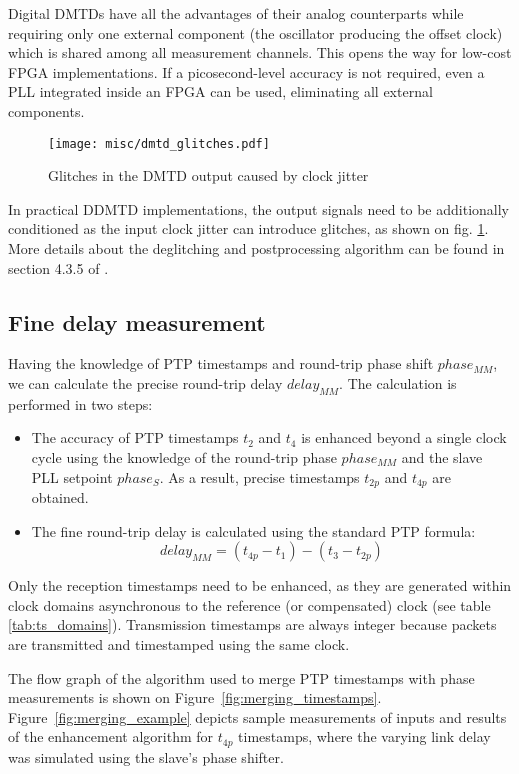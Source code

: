 Digital DMTDs have all the advantages of their analog counterparts while
requiring only one external component (the oscillator producing the offset
clock) which is shared among all measurement channels.	This opens the way
for low-cost FPGA implementations. If a picosecond-level accuracy is not
required, even a PLL integrated inside an FPGA can be used, eliminating all
external components.
\begin{figure}[ht!]
  \centering
  \texttt{[image: misc/dmtd\_glitches.pdf]}
  \caption{Glitches in the DMTD output caused by clock jitter}
  \label{fig:dmtd_glitches}
\end{figure}
In practical DDMTD implementations, the output signals need to be additionally
conditioned as the input clock jitter can introduce glitches, as shown
on fig. \ref{fig:dmtd_glitches}. More details about the deglitching and
postprocessing algorithm can be found in section 4.3.5 of \cite{tomekMSC}.

\subsection{Fine delay measurement}
\label{s:fine_delay}
Having the knowledge of PTP timestamps and round-trip phase shift $phase_{MM}$,
we can calculate the precise round-trip delay $delay_{MM}$. The calculation
is performed in two steps:
\begin{itemize}
\item The accuracy of PTP timestamps $t_{2}$ and $t_{4}$ is enhanced beyond a
single clock cycle using the knowledge of the round-trip phase $phase_{MM}$
and the slave PLL setpoint $phase_{S}$. As a result, precise timestamps
$t_{2p}$ and $t_{4p}$ are obtained.
\item The fine round-trip delay is calculated using the standard PTP formula:
\begin{equation}
\label{eq:ptp_precise}
delay_{MM} = (t_{4p} - t_{1}) - (t_{3} - t_{2p})
\end{equation}
\end{itemize}

Only the reception timestamps need to be enhanced, as they are generated
within clock domains asynchronous to the reference (or compensated) clock
(see table \ref{tab:ts_domains}). Transmission timestamps are always integer
because packets are transmitted and timestamped using the same clock.

The flow graph of the algorithm used to merge PTP timestamps with
phase measurements is shown on Figure~\ref{fig:merging_timestamps}. 
Figure~\ref{fig:merging_example} depicts sample measurements of inputs and results
of the enhancement algorithm for $t_{4p}$ timestamps, where the varying link
delay was simulated using the slave's phase shifter.

